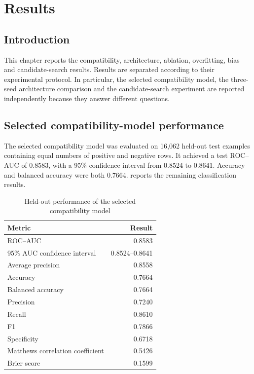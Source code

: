 \chapter{Results}

\section{Introduction}

This chapter reports the compatibility, architecture, ablation, overfitting,
bias and candidate-search results. Results are separated according to their
experimental protocol. In particular, the selected compatibility model, the
three-seed architecture comparison and the candidate-search experiment are
reported independently because they answer different questions.

\section{Selected compatibility-model performance}

The selected compatibility model was evaluated on 16,062 held-out test
examples containing equal numbers of positive and negative rows. It achieved a
test ROC--AUC of 0.8583, with a 95\% confidence interval from 0.8524 to 0.8641.
Accuracy and balanced accuracy were both 0.7664. 
reports the remaining classification results.

\begin{table}[htbp]
  \centering
  \caption{Held-out performance of the selected compatibility model}
  \label{tab:final-model-results}
  \begin{tabular}{lr}
    \toprule
    Metric & Result \\
    \midrule
    ROC--AUC & 0.8583 \\
    95\% AUC confidence interval & 0.8524--0.8641 \\
    Average precision & 0.8558 \\
    Accuracy & 0.7664 \\
    Balanced accuracy & 0.7664 \\
    Precision & 0.7240 \\
    Recall & 0.8610 \\
    F1 & 0.7866 \\
    Specificity & 0.6718 \\
    Matthews correlation coefficient & 0.5426 \\
    Brier score & 0.1599 \\
    \bottomrule
  \end{tabular}
\end{table}

